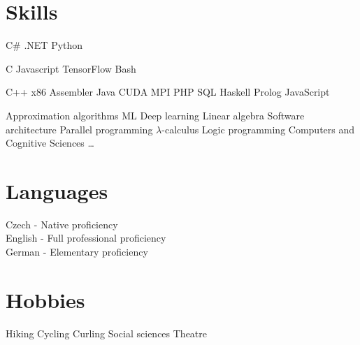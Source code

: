 \documentclass[a4paper]{deedy-resume} %
\begin{document}
\begin{minipage}[t]{0.33\textwidth}
\sectionspace %


\section{Skills}


C\# \textbullet{} .NET \textbullet{}  Python \\ 
\halfsectionspace %

C \textbullet{} Javascript \textbullet{} TensorFlow \textbullet{} Bash \\
\halfsectionspace %

C++ \textbullet{} x86 Assembler \textbullet{} Java \textbullet{} CUDA \textbullet{} MPI \textbullet{} PHP \textbullet{} SQL \textbullet{} Haskell \textbullet{} Prolog \textbullet JavaScript \\

\sectionspace %


Approximation algorithms \textbullet{} ML \textbullet{} Deep learning \textbullet{} Linear algebra \textbullet{} Software architecture \textbullet{} Parallel programming \textbullet{} $\lambda$-calculus \textbullet{} Logic programming \textbullet{} Computers and Cognitive Sciences \textbullet{} \ldots 

\sectionspace %

\section{Languages}

Czech - Native proficiency \\
English - Full professional proficiency \\
German - Elementary proficiency

\sectionspace %

\section{Hobbies}

Hiking \textbullet{} Cycling \textbullet{} Curling \textbullet{} Social sciences \textbullet{} Theatre

\sectionspace %


\end{minipage} %
\end{document}
